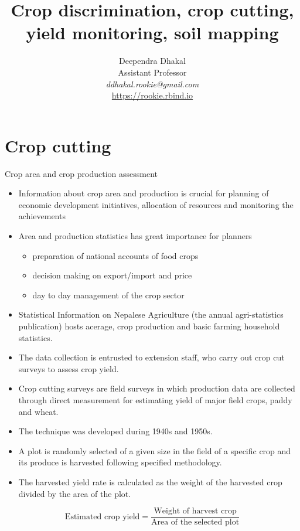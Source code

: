 \documentclass[11pt,dvipsnames,ignorenonframetext,aspectratio=169]{beamer}
\title[]{Crop discrimination, crop cutting, yield monitoring, soil
mapping}
\author[
        \vspace{-0.5cm}Deependra Dhakal\\
Assistant Professor\\
\textit{ddhakal.rookie@gmail.com}\\
\url{https://rookie.rbind.io}
    ]{\vspace{-0.5cm}Deependra Dhakal\\
Assistant Professor\\
\textit{ddhakal.rookie@gmail.com}\\
\url{https://rookie.rbind.io}}
\date[
      
  ]{
    }
\providecommand{\tightlist}{%
  \setlength{\itemsep}{0pt}\setlength{\parskip}{0pt}}
\begin{document}
  \begin{frame}[plain]
  \titlepage
  \end{frame}



\hypertarget{crop-cutting}{%
\section{Crop cutting}\label{crop-cutting}}

\begin{frame}{Crop area and crop production assessment}
\protect\hypertarget{crop-area-and-crop-production-assessment}{}
\begin{itemize}
\tightlist
\item
  Information about crop area and production is crucial for planning of
  economic development initiatives, allocation of resources and
  monitoring the achievements
\item
  Area and production statistics has great importance for planners

  \begin{itemize}
  \tightlist
  \item
    preparation of national accounts of food crops
  \item
    decision making on export/import and price
  \item
    day to day management of the crop sector
  \end{itemize}
\item
  Statistical Information on Nepalese Agriculture (the annual
  agri-statistics publication) hosts acerage, crop production and basic
  farming household statistics.
\item
  The data collection is entrusted to extension staff, who carry out
  crop cut \alert{surveys} to assess crop yield.
\end{itemize}
\end{frame}

\begin{frame}{}
\protect\hypertarget{section}{}
\begin{itemize}
\tightlist
\item
  Crop cutting surveys are field surveys in which production data are
  collected through direct measurement for estimating yield of major
  field crops, paddy and wheat.
\item
  The technique was developed during 1940s and 1950s.
\item
  A \alert{plot} is \alert{randomly} selected of a given size in the
  field of a specific crop and its produce is harvested following
  specified methodology.
\item
  The harvested yield rate is calculated as the weight of the harvested
  crop divided by the area of the plot.
\end{itemize}

\[
\text{Estimated crop yield} = \frac{\text{Weight of harvest crop}}{\text{Area of the selected plot}}
\]
\end{frame}
\end{document}
